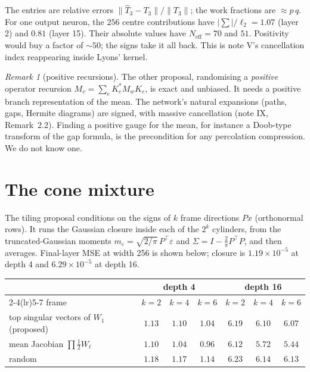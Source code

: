 \documentclass[11pt]{article}
\theoremstyle{definition}
\theoremstyle{remark}
\newtheorem{remark}[theorem]{Remark}
\begin{document}
\noindent The entries are relative errors $\|\hat T_3-T_3\|/\|T_3\|$; the work fractions are $\approx p\,q$. For one output neuron, the $256$ centre contributions have $|\sum|/\ell_2=1.07$ (layer 2) and $0.81$ (layer 15). Their absolute values have $N_{\mathrm{eff}}=70$ and $51$. Positivity would buy a factor of $\sim50$; the signs take it all back. This is note V's cancellation index reappearing inside Lyons' kernel.

\begin{remark}[positive recursions]\label{rem:positive}
The other proposal, randomising a \emph{positive} operator recursion $M_v=\sum_eK_e^*M_wK_e$, is exact and unbiased. It needs a positive branch representation of the mean. The network's natural expansions (paths, gaps, Hermite diagrams) are signed, with massive cancellation (note IX, Remark~2.2). Finding a positive gauge for the mean, for instance a Doob-type transform of the gap formula, is the precondition for any percolation compression. We do not know one.
\end{remark}

\section{The cone mixture}\label{sec:cones}

The tiling proposal conditions on the signs of $k$ frame directions $Px$ (orthonormal rows). It runs the Gaussian closure inside each of the $2^k$ cylinders, from the truncated-Gaussian moments $m_\varepsilon=\sqrt{2/\pi}\,P^\top\varepsilon$ and $\Sigma=I-\tfrac2\pi P^\top P$, and then averages. Final-layer MSE at width 256 is shown below; closure is $1.19\times10^{-5}$ at depth 4 and $6.29\times10^{-5}$ at depth 16.

\begin{center}\small
\begin{tabular}{@{}lcccccc@{}}
\toprule
& \multicolumn{3}{c}{depth 4} & \multicolumn{3}{c}{depth 16}\\
\cmidrule(lr){2-4}\cmidrule(lr){5-7}
frame & $k=2$ & $k=4$ & $k=6$ & $k=2$ & $k=4$ & $k=6$\\
\midrule
top singular vectors of $W_1$ (proposed) & $1.13$ & $1.10$ & $1.04$ & $6.19$ & $6.10$ & $6.07$\\
mean Jacobian $\prod\frac12W_\ell$ & $1.10$ & $1.04$ & $0.96$ & $6.12$ & $5.72$ & $5.44$\\
random & $1.18$ & $1.17$ & $1.14$ & $6.23$ & $6.14$ & $6.13$\\
\bottomrule
\end{tabular}
\end{center}
\end{document}
